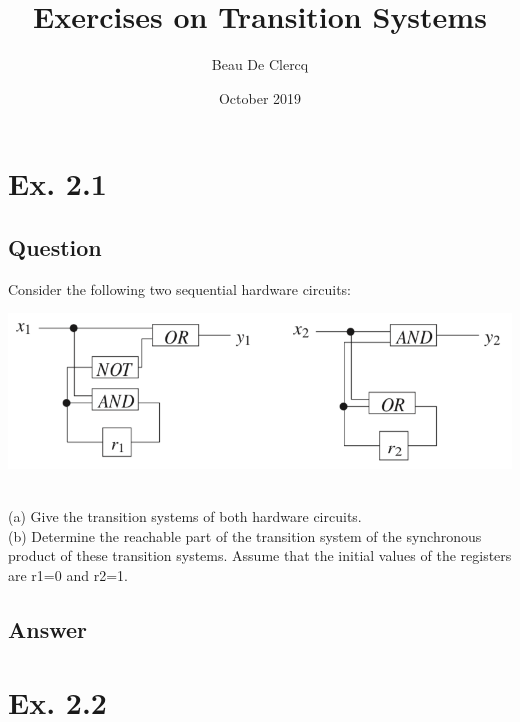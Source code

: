 \documentclass[12pt]{article}
\title{Exercises on Transition Systems}
\author{Beau De Clercq}
\date{October 2019}
\begin{document}
\maketitle{}

\tableofcontents

\clearpage
\newpage

\section*{Ex. 2.1}
\subsection*{Question}
Consider the following two sequential hardware circuits:\\
\begin{centering}
	\includegraphics*[width=\linewidth]{circuits.png}
\end{centering}
\\
(a) Give the transition systems of both hardware circuits.\\
(b) Determine the reachable part of the transition system of the synchronous product of these
transition systems. Assume that the initial values of the registers are r1=0 and r2=1.

\subsection*{Answer}

\newpage
\section*{Ex. 2.2}
\end{document}
